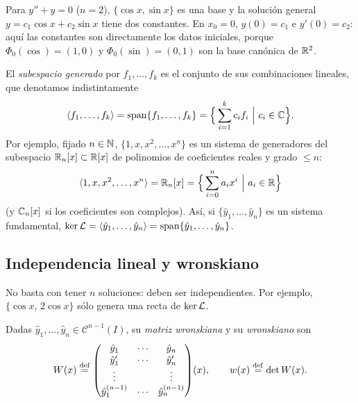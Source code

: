 \begin{ejemplo}\label{ej:oscilador-base}
Para $y''+y=0$ ($n=2$), $\{\cos x,\sin x\}$ es una base y la solución
general $y=c_1\cos x+c_2\sin x$ tiene dos constantes. En $x_0=0$,
$y(0)=c_1$ e $y'(0)=c_2$: aquí las constantes son directamente los datos
iniciales, porque $\Phi_0(\cos)=(1,0)$ y $\Phi_0(\sin)=(0,1)$ son la base
canónica de $\mathbb{R}^{2}$.
\end{ejemplo}

\begin{notacion}\label{not:generado}
El \emph{subespacio generado} por $f_1,\dots,f_k$ es el conjunto de sus
combinaciones lineales, que denotamos indistintamente
\begin{equation}\label{eq:generado}
  \langle f_1,\dots,f_k\rangle=\operatorname{span}\{f_1,\dots,f_k\}
  =\Bigl\{\,\sum_{i=1}^{k}c_if_i\ \Big|\ c_i\in\mathbb{C}\Bigr\}.
\end{equation}
Por ejemplo, fijado $n\in\mathbb{N}$, $\{1,x,x^{2},\dots,x^{n}\}$ es un sistema de
generadores del subespacio $\mathbb{R}_n[x]\subset\mathbb{R}[x]$ de polinomios de
coeficientes reales y grado $\le n$:
\[
  \gen{1,x,x^{2},\dots,x^{n}}=\R_n[x]=\Bigl\{\,\sum_{i=0}^{n}a_ix^{i}\ \Big|\ a_i\in\R\Bigr\}
\]
(y $\mathbb{C}_n[x]$ si los coeficientes son complejos). Así, si
$\{\hat y_1,\dots,\hat y_n\}$ es un sistema fundamental,
$\operatorname{ker}\mathcal{L}=\langle \hat y_1,\dots,\hat y_n\rangle=\operatorname{span}\{\hat y_1,\dots,\hat y_n\}$.
\end{notacion}



\subsection{Independencia lineal y wronskiano}\label{sec:wronskiano}
No basta con tener $n$ soluciones: deben ser independientes. Por ejemplo,
$\{\cos x,\,2\cos x\}$ sólo genera una recta de $\operatorname{ker}\mathcal{L}$.

\begin{definicion}\label{def:wronskiano}
Dadas $\hat y_1,\dots,\hat y_n\in\mathcal C^{n-1}(I)$, su \emph{matriz
wronskiana} y su \emph{wronskiano} son
\begin{equation}\label{eq:wronskiana}
  W(x)\mathrel{\overset{\mathrm{def}}{=}}
  \begin{pmatrix}
    \hat y_1 & \cdots & \hat y_n\\
    \hat y_1' & \cdots & \hat y_n'\\
    \vdots & & \vdots\\
    \hat y_1^{(n-1)} & \cdots & \hat y_n^{(n-1)}
  \end{pmatrix}\!(x),
  \qquad w(x)\mathrel{\overset{\mathrm{def}}{=}}\det W(x).
\end{equation}
\end{definicion}

